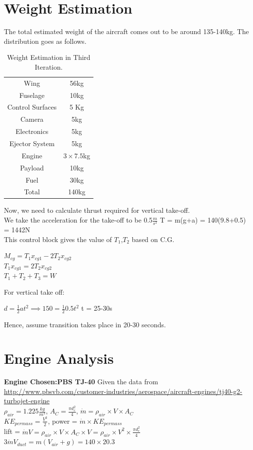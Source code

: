 \section{Weight Estimation}
The total estimated weight of the aircraft comes out to be around 135-140kg. The distribution goes as follows.\\
\begin{table}[H]
\begin{center}
\begin{tabular}{ |c| c| }
\hline
 Wing & 56kg \\ 
 Fuselage & 10kg \\ 
 Control Surfaces & 5 Kg \\ 
 Camera & 5kg \\
 Electronics & 5kg \\
 Ejector System & 5kg \\
 Engine & $3\times7.5$kg \\
 Payload & 10kg \\
 Fuel & 30kg \\
 \hline
 Total & 140kg \\
\hline
\end{tabular}
\end{center}
\caption{Weight Estimation in Third Iteration.}
\label{Table3}
\end{table}
Now, we need to calculate thrust required for vertical take-off. \\
We take the acceleration for the take-off to be 0.5$\frac{m}{s^2}$
T = m(g+a) = 140(9.8+0.5) = 1442N \\
This control block gives the value of $T_1$,$T_2$ based on C.G.
\begin{center}
$M_{cg} = T_1x_{cg1} - 2T_2x_{cg2}$ \\
$T_1x_{cg1} = 2T_2x_{cg2}$ \\
$T_1 + T_2 + T_3 = W$ \\
\end{center}
For vertical take off:
\begin{center}
$d = \frac{1}{2}at^2 \implies 150 = \frac{1}{2}0.5t^2$
t = 25-30s
\end{center}
Hence, assume transition takes place in 20-30 seconds. 
\section{Engine Analysis}
\textbf{Engine Chosen:PBS TJ-40} Given the data from  \url{http://www.pbsvb.com/customer-industries/aerospace/aircraft-engines/tj40-g2-turbojet-engine} \\
$\rho_{air} = 1.225\frac{kg}{m^3}$, $A_C = \frac{\pi d_c^2}{4}$, $\dot{m} = \rho_{air} \times V \times A_C$ \\
$KE_{per mass} = \frac{V^2}{2}$, power = $\dot{m}\times KE_{per mass}$ \\
lift = $\dot{m}V = \rho_{air}\times V\times A_C\times V = \rho_{air}\times V^2 \times \frac{\pi d_c^2}{4}$ \\
$3\dot{m}V_{duct} = m(V_{air} + g) = 140\times 20.3$
